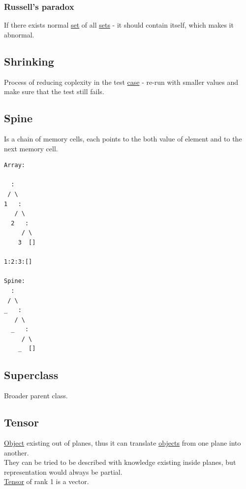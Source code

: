 \documentclass[11pt]{article}
\begin{document}
\subsubsection{\label{orga240e2d}Russell's paradox}
\label{sec:orgfce216b}
If there exists normal \hyperref[org1faf06d]{set} of all \hyperref[org58ec608]{sets} - it should contain itself, which makes it abnormal.\\

\subsection{\label{org75e4286}Shrinking}
\label{sec:org517b4d1}
Process of reducing coplexity in the test \hyperref[org41d12b6]{case} - re-run with smaller values and make sure that the test still fails.\\

\subsection{\label{org242c92e}Spine}
\label{sec:org7e7339f}
Is a chain of memory cells, each points to the both value of element and to the next memory cell.\\
\begin{verbatim}
Array:

  :
 / \
1   :
   / \
  2   :
     / \
    3  []

1:2:3:[]

Spine:
  :
 / \
_   :
   / \
  _   :
     / \
    _  []

\end{verbatim}

\subsection{\label{orgd8749fa}Superclass}
\label{sec:orga4f4af1}
Broader parent class.\\

\subsection{\label{org7fc4e6f}Tensor}
\label{sec:orgd82031f}
\hyperref[org4be0e9d]{Object} existing out of planes, thus it can translate \hyperref[org363acc2]{objects} from one plane into another.\\
They can be tried to be described with knowledge existing inside planes, but representation would always be partial.\\
\hyperref[org7fc4e6f]{Tensor} of rank 1 is a vector.\\
\end{document}
